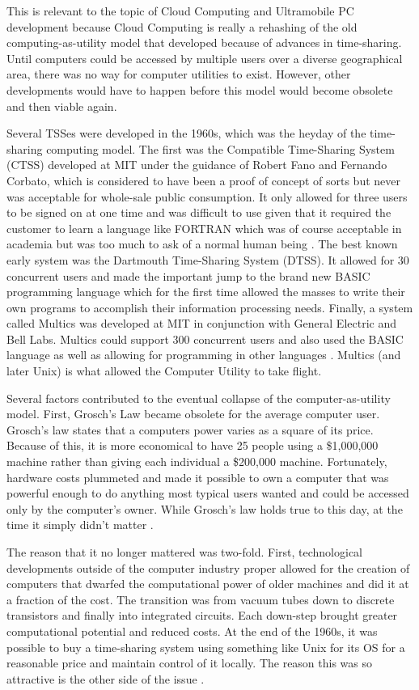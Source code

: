 This is relevant to the topic of Cloud Computing and Ultramobile PC development
because Cloud Computing is really a rehashing of the old computing-as-utility
model that developed because of advances in time-sharing.  Until computers could
be accessed by multiple users over a diverse geographical area, there was no way
for computer utilities to exist.  However, other developments would have to
happen before this model would become obsolete and then viable again.

Several TSSes were developed in the 1960s, which was the heyday of the
time-sharing computing model.  The first was the Compatible Time-Sharing System
(CTSS) developed at MIT under the guidance of Robert Fano and Fernando Corbato,
which is considered to have been a proof of concept of sorts but never was
acceptable for whole-sale public consumption.  It only allowed for three users
to be signed on at one time and was difficult to use given that it required the
customer to learn a language like FORTRAN which was of course acceptable in
academia but was too much to ask of a normal human being \citep{kelly2004}.
The best known early system was the Dartmouth Time-Sharing System (DTSS).  It
allowed for 30 concurrent users and made the important jump to the brand new
BASIC programming language which for the first time allowed the masses to write
their own programs to accomplish their information processing needs.  Finally, a
system called Multics was developed at MIT in conjunction with General Electric
and Bell Labs.  Multics could support 300 concurrent users and also used the
BASIC language as well as allowing for programming in other languages
\citep{levy1994}.  Multics (and later Unix) is what allowed the Computer Utility
to take flight.

Several factors contributed to the eventual collapse of the computer-as-utility
model.  First, Grosch's Law became obsolete for the average computer user.
Grosch's law states that a computers power varies as a square of its price.
Because of this, it is more economical to have 25 people using a \$1,000,000
machine rather than giving each individual a \$200,000 machine.  Fortunately,
hardware costs plummeted and made it possible to own a computer that was
powerful enough to do anything most typical users wanted and could be accessed
only by the computer's owner.  While Grosch's law holds true to this day, at the
time it simply didn't matter \citep{kelly2004}.

The reason that it no longer mattered was two-fold.  First, technological
developments outside of the computer industry proper allowed for the creation of
computers that dwarfed the computational power of older machines and did it at a
fraction of the cost.  The transition was from vacuum tubes down to discrete
transistors and finally into integrated circuits.  Each down-step brought
greater computational potential and reduced costs.  At the end of the 1960s, it
was possible to buy a time-sharing system using something like Unix for its OS
for a reasonable price and maintain control of it locally.  The reason this was
so attractive is the other side of the issue \citep{kelly2004}.

